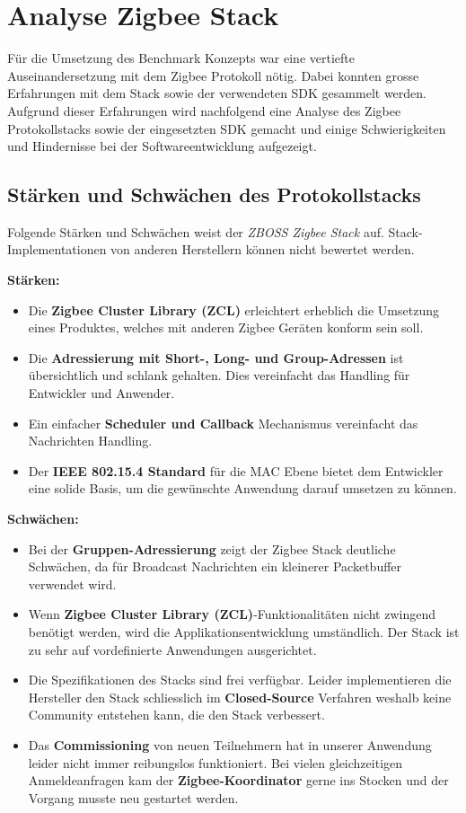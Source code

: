 \clearpage
\section{Analyse Zigbee Stack}\label{sec:AnalyseZigbeeStack}
Für die Umsetzung des Benchmark Konzepts war eine vertiefte Auseinandersetzung mit dem Zigbee Protokoll nötig.
Dabei konnten grosse Erfahrungen mit dem Stack sowie der verwendeten SDK gesammelt werden.
Aufgrund dieser Erfahrungen wird nachfolgend eine Analyse des Zigbee Protokollstacks sowie der eingesetzten SDK gemacht und einige Schwierigkeiten und Hindernisse bei der Softwareentwicklung aufgezeigt.

\subsection{Stärken und Schwächen des Protokollstacks}\label{subsec:ZigbeeStärkenundSchwächendesProtokollstacks}
Folgende Stärken und Schwächen weist der \textit{ZBOSS Zigbee Stack} auf.
Stack-Implementationen von anderen Herstellern können nicht bewertet werden.

\textbf{Stärken:}
\begin{itemize}
\item Die \textbf{Zigbee Cluster Library (ZCL)} erleichtert erheblich die Umsetzung eines Produktes, welches mit anderen Zigbee Geräten konform sein soll.
\item Die \textbf{Adressierung mit Short-, Long- und Group-Adressen} ist übersichtlich und schlank gehalten.
Dies vereinfacht das Handling für Entwickler und Anwender.
\item Ein einfacher \textbf{Scheduler und Callback} Mechanismus vereinfacht das Nachrichten Handling.
\item Der \textbf{IEEE 802.15.4 Standard} für die MAC Ebene bietet dem Entwickler eine solide Basis, um die gewünschte Anwendung darauf umsetzen zu können.
\end{itemize}

\textbf{Schwächen:}
\begin{itemize}
\item Bei der \textbf{Gruppen-Adressierung} zeigt der Zigbee Stack deutliche Schwächen, da für Broadcast Nachrichten ein kleinerer Packetbuffer verwendet wird.
\item Wenn \textbf{Zigbee Cluster Library (ZCL)}-Funktionalitäten nicht zwingend benötigt werden, wird die Applikationsentwicklung umständlich.
Der Stack ist zu sehr auf vordefinierte Anwendungen ausgerichtet.
\item Die Spezifikationen des Stacks sind frei verfügbar. Leider implementieren die Hersteller den Stack schliesslich im \textbf{Closed-Source} Verfahren weshalb keine Community entstehen kann, die den Stack verbessert.
\item Das \textbf{Commissioning} von neuen Teilnehmern hat in unserer Anwendung leider nicht immer reibungslos funktioniert.
Bei vielen gleichzeitigen Anmeldeanfragen kam der \textbf{Zigbee-Koordinator} gerne ins Stocken und der Vorgang musste neu gestartet werden.
\end{itemize}


